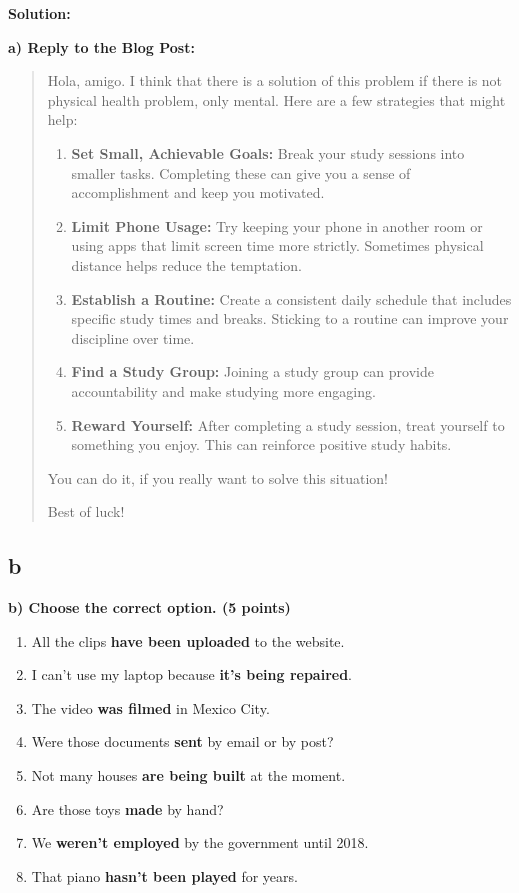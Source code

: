 \documentclass[a4paper,12pt]{article}
\begin{document}
\textbf{Solution:}

\textbf{a) Reply to the Blog Post:}

\begin{quote}
Hola, amigo. I think that there is a solution of this problem if there is not physical health problem, only mental. Here are a few strategies
that might help:
\begin{enumerate}
\item \textbf{Set Small, Achievable Goals:} Break your study sessions into smaller tasks. Completing these can give you a sense of accomplishment and keep you motivated.

\item \textbf{Limit Phone Usage:} Try keeping your phone in another room or using apps that limit screen time more strictly. Sometimes physical distance helps reduce the temptation.

\item \textbf{Establish a Routine:} Create a consistent daily schedule that includes specific study times and breaks. Sticking to a routine can improve your discipline over time.

\item \textbf{Find a Study Group:} Joining a study group can provide accountability and make studying more engaging.

\item \textbf{Reward Yourself:} After completing a study session, treat yourself to something you enjoy. This can reinforce positive study habits.
\end{enumerate}
You can do it, if you really want to solve this situation!

Best of luck!
\end{quote}

\vspace{1cm}

\subsection{b}
\textbf{b) Choose the correct option. (5 points)}

\begin{enumerate}
    \item All the clips \textbf{have been uploaded} to the website.
    \item I can’t use my laptop because \textbf{it’s being repaired}.
    \item The video \textbf{was filmed} in Mexico City.
    \item Were those documents \textbf{sent} by email or by post?
    \item Not many houses \textbf{are being built} at the moment.
    \item Are those toys \textbf{made} by hand?
    \item We \textbf{weren’t employed} by the government until 2018.
    \item That piano \textbf{hasn’t been played} for years.
\end{enumerate}
\end{document}
